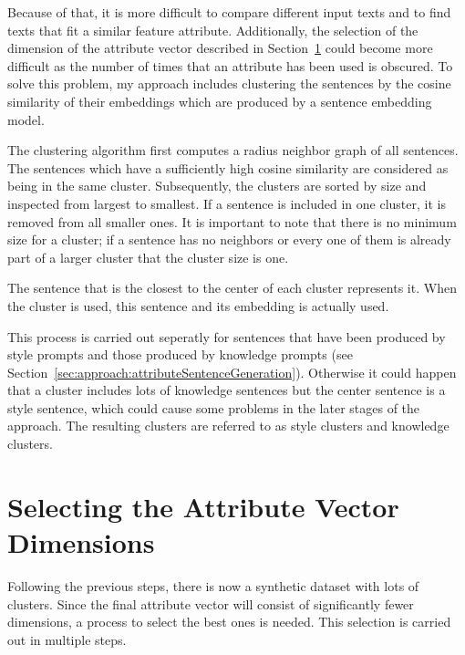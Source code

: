 Because of that, it is more difficult to compare different input texts and to find texts that fit a similar feature attribute. Additionally, the selection of the dimension of the attribute vector described in Section~\ref{sec:approach:selection} could become more difficult as the number of times that an attribute has been used is obscured.
To solve this problem, my approach includes clustering the sentences by the cosine similarity of their embeddings which are produced by a sentence embedding model.

The clustering algorithm first computes a radius neighbor graph of all sentences. The sentences which have a sufficiently high cosine similarity are considered as being in the same cluster. Subsequently, the clusters are sorted by size and inspected from largest to smallest. If a sentence is included in one cluster, it is removed from all smaller ones. It is important to note that there is no minimum size for a cluster; if a sentence has no neighbors or every one of them is already part of a larger cluster that the cluster size is one.

The sentence that is the closest to the center of each cluster represents it. When the cluster is used, this sentence and its embedding is actually used.

This process is carried out seperatly for sentences that have been produced by style prompts and those produced by knowledge prompts (see Section~\ref{sec:approach:attributeSentenceGeneration}). Otherwise it could happen that a cluster includes lots of knowledge sentences but the center sentence is a style sentence, which could cause some problems in the later stages of the approach. %
The resulting clusters are referred to as style clusters and knowledge clusters.


\section{Selecting the Attribute Vector Dimensions}
\label{sec:approach:selection}

Following the previous steps, there is now a synthetic dataset with lots of clusters. Since the final attribute vector will consist of significantly fewer dimensions, a process to select the best ones is needed. This selection is carried out in multiple steps.

